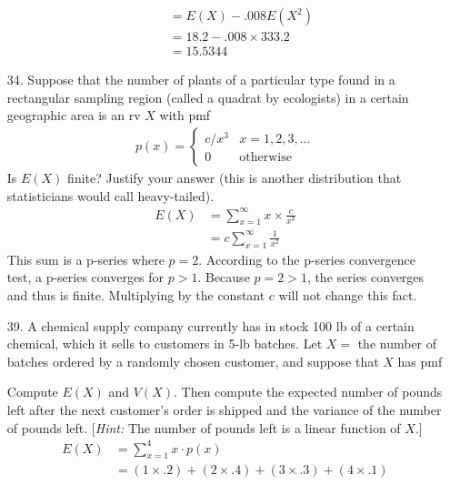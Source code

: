 \documentclass[letterpaper,12pt]{article}
\begin{document}
\begin{enumerate}
\begin{enumerate}
\begin{align*}
          &= E(X) - .008E(X^2) \\
          &= 18.2 - .008 \times 333.2 \\
          &= 15.5344
        \end{align*}
    \end{enumerate}
  \item[34.]
    Suppose that the number of plants of a particular type found in a rectangular sampling region (called a quadrat by ecologists) in a certain geographic area is an rv $X$ with pmf
    \begin{align*}
      p(x) = \begin{cases}
        c/x^3 & x = 1, 2, 3, \ldots \\
        0     & \text{otherwise}
      \end{cases}
    \end{align*}
    Is $E(X)$ finite? Justify your answer (this is another distribution that statisticians would call heavy-tailed).
    \begin{align*}
      E(X) &= \sum_{x = 1}^\infty x \times \frac{c}{x^3} \\
      &= c \sum_{x = 1}^\infty \frac{1}{x^2}
    \end{align*}
    This sum is a p-series where $p = 2$. According to the p-series convergence test, a p-series converges for $p > 1$. Because $p = 2 > 1$, the series converges and thus is finite. Multiplying by the constant $c$ will not change this fact.
  \item[39.]
    A chemical supply company currently has in stock 100 lb of a certain chemical, which it sells to customers in 5-lb batches. Let $X =$ the number of batches ordered by a randomly chosen customer, and suppose that $X$ has pmf
    \begin{center}
    \end{center}
    Compute $E(X)$ and $V(X)$. Then compute the expected number of pounds left after the next customer’s order is shipped and the variance of the number of pounds left. [\textit{Hint:} The number of pounds left is a linear function of $X$.]
    \begin{align*}
      E(X) &= \sum_{x = 1}^4 x \cdot p(x) \\
      &= (1 \times .2) + (2 \times .4) + (3 \times .3) + (4 \times .1) \\

\end{align*}
\end{enumerate}
\end{document}
